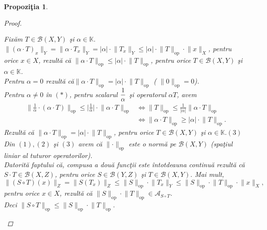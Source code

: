 \documentclass[ a4paper, 12pt]{report}
\newtheorem{prop}[theorem]{\bf Propozi\c tia }
\theoremstyle{definition}
\theoremstyle{remark}
\numberwithin{equation}{section}
\begin{document}
\begin{prop}
\begin{proof}
\begin{enumerate}[(a)]
Fix\u am $T \in \mathcal{B}(X,Y)$ \c si  $\alpha \in \mathbb{K}.$\\
$\lVert (\alpha \cdot T )_x\rVert_{Y} = \lVert \alpha \cdot T_x  \rVert_{Y} = \lvert \alpha \rvert \cdot \lVert T_x \rVert_{Y} \leq \lvert \alpha \rvert \cdot \lVert T \rVert_{\mbox{op}} \cdot \lVert x \rVert_{X}$, pentru orice $x \in X$, rezult\u a c\u a $\lVert \alpha \cdot T  \rVert_{\mbox{op}} \leq \lvert \alpha \rvert \cdot \lVert T \rVert_{\mbox{op}}$, pentru orice $T \in \mathcal{B}(X,Y)$ \c si $\alpha \in \mathbb{K}$.\\
Pentru $\alpha = 0$ rezult\u a c\u a$\lVert  \alpha \cdot T \rVert_{\mbox{op}} = \lvert \alpha \rvert \cdot \lVert T \rVert_{\mbox{op}}$ ( $\lVert 0 \rVert_{\mbox{op}} = 0$).\\
Pentru $\alpha \neq 0$ \^in $(\ast)$, pentru scalarul $\displaystyle\frac{1}{\alpha}$ \c si operatorul $\alpha T$, avem
\begin{align*}
\lVert \frac{1}{\alpha} \cdot (\alpha \cdot T) \rVert_{\mbox{op}} \leq \lvert  \frac{1}{\alpha} \rvert \cdot \lVert \alpha \cdot T \rVert_{\mbox{op}} &\Leftrightarrow
\lVert T \rVert_{\mbox{op}} \leq \frac{1}{\lvert \alpha \rvert} \lVert \alpha \cdot T \rVert_{\mbox{op}}\\
&\Leftrightarrow \lVert \alpha \cdot T \rVert_{\mbox{op}} \geq \lvert \alpha \rvert \cdot \lVert T \rVert_{\mbox{op}}.
\end{align*}
Rezult\u a c\u a $\lVert\! \alpha\! \cdot\! T \rVert_{\mbox{op}}\! =\! \lvert \alpha \rvert \cdot \lVert T \rVert_{\mbox{op}}$, pentru orice $T\!\! \in\!\! \mathcal{B}(X,Y)$ \c si  $\alpha \in \mathbb{K}. (3) $
Din $(1),(2)$ \c si $(3)$ avem c\u a $\lVert \cdot  \rVert_{\mbox{op}}$ este o norm\u a pe $\mathcal{B}(X,Y)$ (spa\c tiul liniar al tuturor operatorilor).\\
Datorit\u a faptului c\u a, compusa a dou\u a func\c tii este \^intotdeauna continu\u a rezult\u a c\u a $S \cdot T \in \mathcal{B}(X,Z)$, pentru orice $S \in \mathcal{B}(Y,Z)$ \c si $T \in \mathcal{B}(X,Y)$.
Mai mult,
\[ \lVert (S \circ T)(x) \rVert_{Z} = \lVert S(T_x)  \rVert_{Z} \leq \lVert S \rVert_{\mbox{op}} \cdot \lVert T_x \rVert_{Y} \leq \lVert S \rVert_{\mbox{op}} \cdot \lVert T \rVert_{\mbox{op}} \cdot \lVert x \rVert_{X} ,\] pentru orice $x \in X$, rezult\u a c\u a $\lVert S \rVert_{\mbox{op}} \cdot \lVert T \rVert_{\mbox{op}} \in \mathcal{A}_{S \circ T}$.\\
 Deci $\lVert S \circ T \rVert_{\mbox{op}} \leq \lVert S \rVert_{\mbox{op}} \cdot \lVert T \rVert_{\mbox{op}}.$
\end{enumerate}
\end{proof}
\end{prop}
\end{document}

